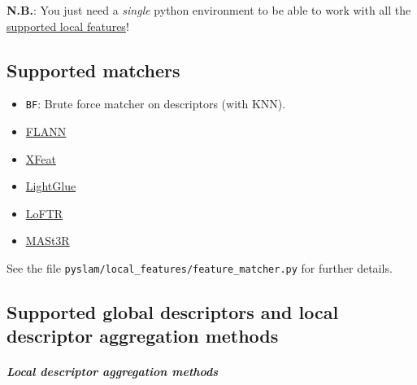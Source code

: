 \documentclass{article}
\let\oldsubparagraph\subparagraph
\renewcommand{\subparagraph}[1]{\oldsubparagraph{#1}\mbox{}}
\begin{document}
\textbf{N.B.}: You just need a \emph{single} python environment to be
able to work with all the
\protect\hyperlink{supported-local-features}{supported local features}!

\hypertarget{supported-matchers}{%
\subsection{Supported matchers}\label{supported-matchers}}

\begin{itemize}
    \item \texttt{BF}: Brute force matcher on descriptors (with KNN).
    \item \href{https://www.semanticscholar.org/paper/Fast-Approximate-Nearest-Neighbors-with-Automatic-Muja-Lowe/35d81066cb1369acf4b6c5117fcbb862be2af350}{FLANN} \cite{muja2009fast}
    \item \href{https://arxiv.org/abs/2404.19174}{XFeat} \cite{barroso2024xfeat}
    \item \href{https://arxiv.org/abs/2306.13643}{LightGlue} \cite{lindenberger2023lightglue}
    \item \href{https://arxiv.org/abs/2104.00680}{LoFTR} \cite{sun2021loftr}
    \item \href{https://arxiv.org/abs/2406.09756}{MASt3R} \cite{master}
\end{itemize}

See the file \texttt{pyslam/local\_features/feature\_matcher.py} for further
details.

\hypertarget{supported-global-descriptors-and-local-descriptor-aggregation-methods}{%
\subsection{Supported global descriptors and local descriptor
aggregation
methods}\label{supported-global-descriptors-and-local-descriptor-aggregation-methods}}

\hypertarget{local-descriptor-aggregation-methods}{%
\subparagraph{Local descriptor aggregation
methods}\label{local-descriptor-aggregation-methods}}
\end{document}
